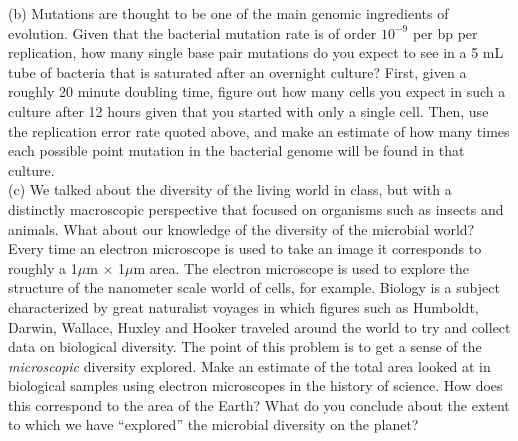 \documentclass[12pt]{article}    %
\begin{document}
%

(b) Mutations are thought to be one of the main genomic ingredients of evolution.
Given that the bacterial mutation rate is of order $10^{-9}$ per bp per replication, how many
single base pair mutations do you expect to see in a 5 mL tube of bacteria that is saturated
after an overnight culture?  First,
given a roughly 20 minute doubling time, figure out how many cells you expect
in such a culture after 12 hours given that you started with
only a single cell.   Then,  use the replication error rate quoted above,
and make an estimate of how many times each possible point mutation in the
bacterial genome will be found in that culture.  \\

(c) We talked about the diversity of the living world in class,
but with a distinctly macroscopic perspective that focused on
organisms such as insects and animals.  What
about our knowledge of the diversity of the
microbial world?  Every time an electron microscope is used to take an image
it corresponds to roughly a 1$\mu$m $\times$ 1$\mu$m area.
The electron microscope is used to explore the structure
of the nanometer scale world of cells, for example.  Biology
is a subject characterized by great naturalist voyages in
which figures such as Humboldt, Darwin, Wallace, Huxley
and Hooker traveled around the world to try and collect data on
biological diversity.  The point of this problem is to get  a sense of
the {\it microscopic} diversity explored.  Make an estimate of
the total area looked at in biological samples using electron microscopes
in the history of science.  How does this correspond to the area of
the Earth?  What do you conclude about the extent to which
we have ``explored'' the microbial diversity on the planet?\\
\end{document}
